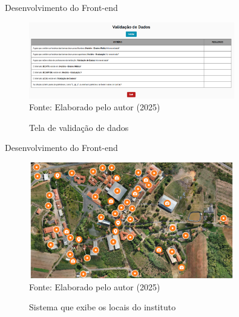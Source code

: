 \begin{frame}{Desenvolvimento do Front-end}
    \begin{figure}
        \centering
        \vspace{-0.5cm}
        \caption{Tela de validação de dados}
        \vspace{-0.2cm}
        \includegraphics[width=0.8\textwidth]{figuras/front-10.png}
        \\ %
        \small Fonte: Elaborado pelo autor (2025)
    \end{figure}
\end{frame}

\begin{frame}{Desenvolvimento do Front-end}
    \begin{figure}
        \centering
        \vspace{-0.5cm}
        \caption{Sistema que exibe os locais do instituto}
        \vspace{-0.2cm}
        \includegraphics[width=0.8\textwidth]{figuras/front-11.png}
        \\ %
        \small Fonte: Elaborado pelo autor (2025)
    \end{figure}
\end{frame}

